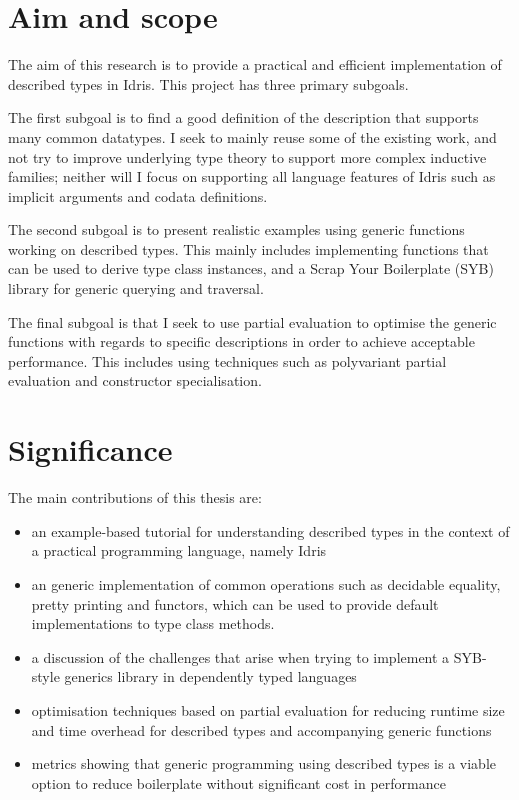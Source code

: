 \documentclass{ituthesis}
\begin{document}
\section{Aim and scope}
\label{sec:AimandScope}
The aim of this research is to provide a practical and efficient implementation of described types in Idris.
This project has three primary subgoals.

The first subgoal is to find a good definition of the description that supports many common datatypes.
I seek to mainly reuse some of the existing work, and not try to improve underlying type theory to support more complex inductive families; neither will I focus on supporting all language features of Idris such as implicit arguments and codata definitions.

The second subgoal is to present realistic examples using generic functions working on described types. 
This mainly includes implementing functions that can be used to derive type class instances, and a Scrap Your Boilerplate (SYB) library for generic querying and traversal.

The final subgoal is that I seek to use partial evaluation to optimise the generic functions with regards to specific descriptions in order to achieve acceptable performance.
This includes using techniques such as polyvariant partial evaluation and constructor specialisation. %

\section{Significance}
\label{sec:Significance}
The main contributions of this thesis are:

\begin{itemize}
  \item an example-based tutorial for understanding described types in the context of a practical programming language, namely Idris
  \item an generic implementation of common operations such as decidable equality, pretty printing and functors, which can be used to provide default implementations to type class methods.
  \item a discussion of the challenges that arise when trying to implement a SYB-style generics library in dependently typed languages
  \item optimisation techniques based on partial evaluation for reducing runtime size and time overhead for described types and accompanying generic functions
  \item metrics showing that generic programming using described types is a viable option to reduce boilerplate without significant cost in performance
\end{itemize}
\end{document}
